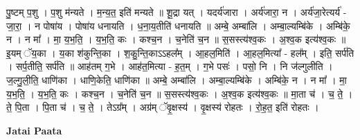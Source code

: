 \documentclass[17pt]{extarticle}
\begin{document}
पु॒ष्टम् प॒शु । प॒शु म॑न्यते । म॒न्य॒त॒ इति॑ मन्यते ॥ शू॒द्रा यत् । यदर्य॑जारा । अर्य॑जारा॒ न । अर्य॑जा॒रेत्यर्य॑ - जा॒रा॒ । न पोषा॑य । पोषा॑य धनायति । ध॒ना॒य॒तीति॑ धनायति ॥ अम्बे॒ अम्बा॑लि । अम्बा॒ल्यम्बि॑के । अम्बि॑के॒ न । न मा᳚ । मा॒ य॒भ॒ति॒ । य॒भ॒ति॒ कः । कश्च॒न । च॒नेति॑ च॒न ॥ स॒सस्त्य॑श्व॒कः । अ॒श्व॒क इत्य॑श्व॒कः ॥ इ॒यम् ॅय॒का । य॒का श॑कुन्ति॒का । श॒कु॒न्ति॒काऽऽहल᳚म् । आ॒हल॒मिति॑ । आ॒हल॒मित्या᳚ - हल᳚म् । इति॒ सर्प॑ति । सर्प॒तीति॒ सर्प॑ति ॥ आह॑तम् ग॒भे । आह॑त॒मित्या - ह॒त॒म् । ग॒भे पसः॑ । पसो॒ नि । नि ज॑ल्गुलीति । ज॒ल्गु॒ली॒ति॒ धाणि॑का । धाणि॒केति॒ धाणि॑का ॥ अम्बे॒ अम्बा॑लि । अम्बा॒ल्यम्बि॑के । अम्बि॑के॒ न । न मा᳚ । मा॒ य॒भ॒ति॒ । य॒भ॒ति॒ कः । कश्च॒न । च॒नेति॑ च॒न ॥ स॒सस्त्य॑श्व॒कः । अ॒श्व॒क इत्य॑श्व॒कः ॥ मा॒ता च॑ । च॒ ते॒ । ते॒ पि॒ता । पि॒ता च॑ । च॒ ते॒ । तेऽग्र᳚म् । अग्र॑म् ॅवृ॒क्षस्य॑ । वृ॒क्षस्य॑ रोहतः । रो॒ह॒त॒ इति॑ रोहतः । \newline

\textbf{Jatai Paata} \newline
\end{document}
